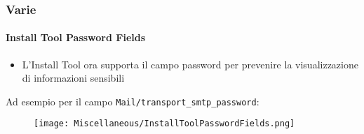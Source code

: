 
\begin{frame}[fragile]
	\frametitle{Varie}
	\framesubtitle{Install Tool Password Fields}

	\begin{itemize}
		\item L'Install Tool ora supporta il campo password per prevenire
			la visualizzazione di informazioni sensibili
	\end{itemize}

	\tabto{0.3cm}Ad esempio per il campo \texttt{Mail/transport\_smtp\_password}:

	\begin{figure}
		\texttt{[image: Miscellaneous/InstallToolPasswordFields.png]}
	\end{figure}

\end{frame}

